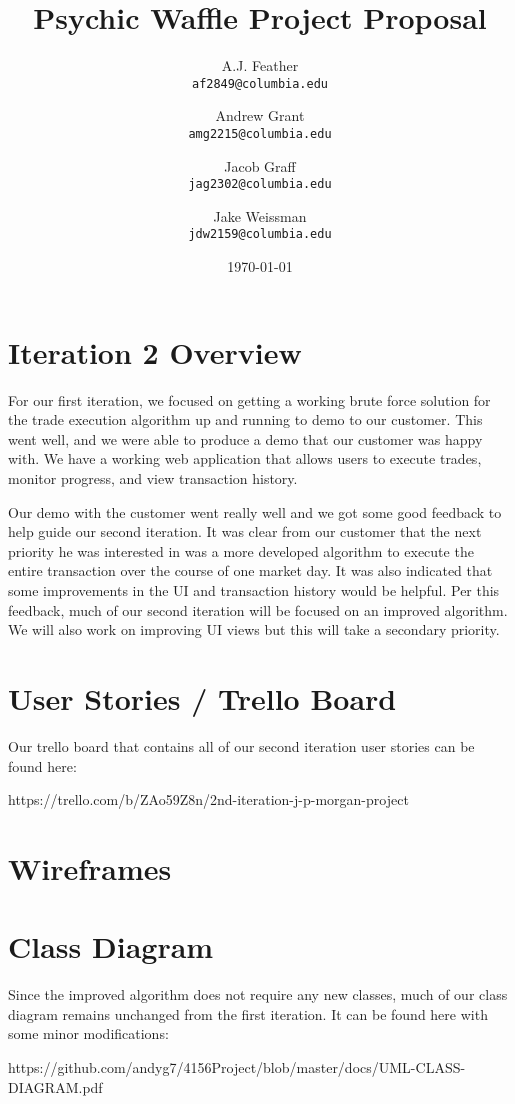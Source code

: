 \documentclass{article}
\title{Psychic Waffle Project Proposal}
\author{
    A.J. Feather\\
    \texttt{af2849@columbia.edu}
    \and
    Andrew Grant\\
    \texttt{amg2215@columbia.edu}
    \and
    Jacob Graff\\
    \texttt{jag2302@columbia.edu}
    \and
    Jake Weissman\\
    \texttt{jdw2159@columbia.edu}
}
\date{\today}
\begin{document}
\maketitle

\section{Iteration 2 Overview}

For our first iteration, we focused on getting a working brute force solution for the trade execution algorithm up and running to demo to our customer. This went well, and we were able to produce a demo that our customer was happy with. We have a working web application that allows users to execute trades, monitor progress, and view transaction history.

Our demo with the customer went really well and we got some good feedback to help guide our second iteration. It was clear from our customer that the next priority he was interested in was a more developed algorithm to execute the entire transaction over the course of one market day. It was also indicated that some improvements in the UI and transaction history would be helpful. Per this feedback, much of our second iteration will be focused on an improved algorithm. We will also work on improving UI views but this will take a secondary priority.

\section{User Stories / Trello Board}

Our trello board that contains all of our second iteration user stories can be found here: 

https://trello.com/b/ZAo59Z8n/2nd-iteration-j-p-morgan-project

\section{Wireframes}

\section{Class Diagram}
Since the improved algorithm does not require any new classes, much of our class diagram remains unchanged from the first iteration. It can be found here with some minor modifications:

https://github.com/andyg7/4156Project/blob/master/docs/UML-CLASS-DIAGRAM.pdf
\end{document}
